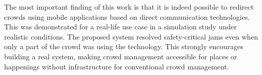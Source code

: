 The most important finding of this work is that it is indeed possible to redirect crowds using mobile applications based on direct communication technologies. This was demonstrated for a real-life use case in a simulation study under realistic conditions.
The proposed system resolved safety-critical jams even when only a part of the crowd was using the technology. 
This strongly encourages building a real system, making crowd management accessible for places or happenings without infrastructure for conventional crowd management. 








